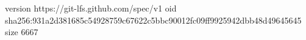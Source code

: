 version https://git-lfs.github.com/spec/v1
oid sha256:931a2d381685c54928759c67622c5bbc90012fc09ff9925942dbb48d49645645
size 6667

